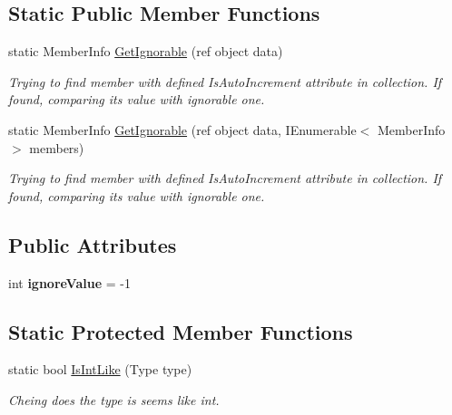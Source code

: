 \subsection*{Static Public Member Functions}
\begin{DoxyCompactItemize}
\item 
static Member\+Info \mbox{\hyperlink{class_uniform_data_operator_1_1_sql_1_1_markup_1_1_is_auto_increment_attribute_ac2747b8dff8be12c4460ed75de72047b}{Get\+Ignorable}} (ref object data)
\begin{DoxyCompactList}\small\item\em Trying to find member with defined Is\+Auto\+Increment attribute in collection. If found, comparing it\textquotesingle{}s value with ignorable one. \end{DoxyCompactList}\item 
static Member\+Info \mbox{\hyperlink{class_uniform_data_operator_1_1_sql_1_1_markup_1_1_is_auto_increment_attribute_a01792b68658d2ad636c7d8684e0e5104}{Get\+Ignorable}} (ref object data, I\+Enumerable$<$ Member\+Info $>$ members)
\begin{DoxyCompactList}\small\item\em Trying to find member with defined Is\+Auto\+Increment attribute in collection. If found, comparing it\textquotesingle{}s value with ignorable one. \end{DoxyCompactList}\end{DoxyCompactItemize}
\subsection*{Public Attributes}
\begin{DoxyCompactItemize}
\item 
\mbox{\label{class_uniform_data_operator_1_1_sql_1_1_markup_1_1_is_auto_increment_attribute_acba50682b9c68a26b2f1aff969580e9c}} 
int {\bfseries ignore\+Value} = -\/1
\end{DoxyCompactItemize}
\subsection*{Static Protected Member Functions}
\begin{DoxyCompactItemize}
\item 
static bool \mbox{\hyperlink{class_uniform_data_operator_1_1_sql_1_1_markup_1_1_is_auto_increment_attribute_a922a00a448b76833772358145b830403}{Is\+Int\+Like}} (Type type)
\begin{DoxyCompactList}\small\item\em Cheing does the type is seems like int. \end{DoxyCompactList}\end{DoxyCompactItemize}


